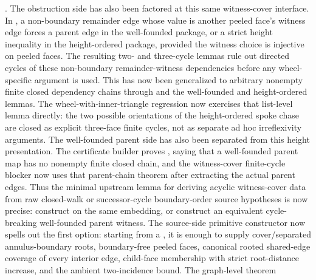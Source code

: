 \documentclass[11pt]{article}
\begin{document}
\begin{itemize}
.
The obstruction side has also been factored at this same witness-cover
interface.  In , a non-boundary
remainder edge whose value is another peeled face's witness edge forces a
parent edge in the well-founded package, or a strict height inequality in the
height-ordered package, provided the witness choice is injective on peeled
faces.  The resulting two- and three-cycle lemmas rule out directed cycles of
these non-boundary remainder-witness dependencies before any wheel-specific
argument is used.  This has now been generalized to arbitrary nonempty finite
closed dependency chains through
 and the well-founded and
height-ordered
 lemmas.
The wheel-with-inner-triangle regression now exercises that list-level lemma
directly: the two possible orientations of the height-ordered spoke chase are
closed as explicit three-face finite cycles, not as separate ad hoc
irreflexivity arguments.
The well-founded parent side has also been separated from this height
presentation.  The certificate builder proves
, saying that a
well-founded parent map has no nonempty finite closed  chain,
and the witness-cover finite-cycle blocker now uses that parent-chain theorem
after extracting the actual parent edges.
Thus the minimal upstream lemma for deriving acyclic witness-cover data from
raw closed-walk or successor-cycle boundary-order source hypotheses is now
precise: construct  on the
same embedding, or construct an equivalent cycle-breaking well-founded parent
witness.  The source-side primitive constructor
now spells out the first option: starting from a
, it is enough to supply
cover/separated annulus-boundary roots, boundary-free peeled faces, canonical
rooted shared-edge coverage of every interior edge, child-face membership with
strict root-distance increase, and the ambient two-incidence bound.  The
graph-level theorem

\end{itemize}
\end{document}
